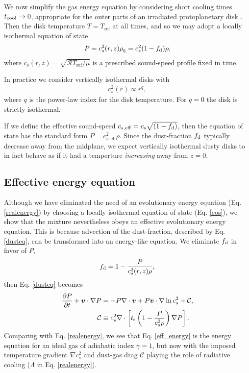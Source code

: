 We now simplify the gas energy equation by considering short cooling 
times $t_\mathrm{cool}\to 0$, appropriate for the outer parts of an irradiated
protoplanetary disk \citep{chiang97,lin15}. Then the disk temperature
$T = T_\mathrm{ref}$ at all times, and so we may
adopt a locally isothermal equation of state 
\begin{align}\label{eos}
  P = c_s^2(r,z)\rho_\mathrm{g} = c_s^{2}(1 - f_\mathrm{d})\rho,   
\end{align}
where $c_s(r,z)= \sqrt{\mathcal{R}T_\mathrm{ref}/\mu}$ is a prescribed
sound-speed profile fixed in time.  

In practice we consider vertically 
isothermal disks with \begin{align}\label{power_temp}
  c_s^2(r) \propto r^{q},
\end{align}
where $q$ is the power-law index for the disk temperature. For $q=0$
the disk is strictly isothermal. 

If we define the effective sound-speed $c_{s,\mathrm{eff}} = c_s\sqrt{\left(1 -
    f_\mathrm{d}\right)}$, then the equation of state has the standard
form $P=c_{s,\mathrm{eff}}^2\rho$. Since the dust-fraction $f_\mathrm{d}$
typically decrease away from the midplane, we expect vertically
isothermal dusty disks to in fact behave as if it
had a temperture \emph{increasing} away from $z=0$.   

\subsection{Effective energy equation}
Although we have eliminated the need of an evolutionary energy
equation (Eq. \ref{realenergy}) by choosing a locally isothermal
equation of state (Eq. \ref{eos}), we show that the mixture 
nevertheless obeys an effective evolutionary energy equation. This is
because advection of the dust-fraction, described by
Eq. \ref{dusteq}, can be transformed into an energy-like 
equation. We 
eliminate $f_\mathrm{d}$ in favor of $P$, 
\begin{align*}
  f_\mathrm{d} = 1 - \frac{P}{c_s^2(r,z)\rho}, 
\end{align*}
then Eq. \ref{dusteq} becomes
\begin{align}
\frac{\partial P}{\partial t} + \bm{v}\cdot\nabla P  
&= - P \nabla\cdot\bm{v} + P\bm{v}\cdot\nabla\ln{c_s^2}
                + \mathcal{C},  \label{eff_energy} \\
\mathcal{C}&\equiv c_s^2 \nabla\cdot\left[t_\mathrm{s}\left(1 -
  \frac{P}{c_s^2\rho}\right)\nabla 
  P\right].
\end{align}
Comparing with Eq. \ref{realenergy}, we see that 
Eq. \ref{eff_energy} is the energy equation for an ideal gas of
adiabatic index $\gamma=1$, but now with the imposed temperature
gradient $\nabla c_s^2$ and dust-gas drag $\mathcal{C}$ playing the
role of radiative cooling ($\Lambda$ in 
Eq. \ref{realenergy}). 

